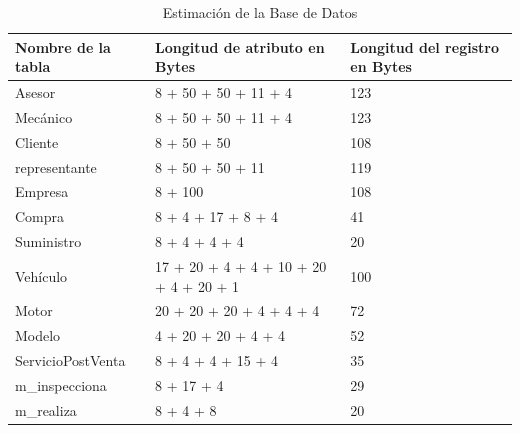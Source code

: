 \documentclass[12pt]{article}
\begin{document}
\begin{table}[h]
    \centering
    \begin{tabular}{|l|p{4cm}|p{4cm}|}
    \hline
    \textbf{Nombre de la tabla} & \textbf{Longitud de atributo en Bytes} & \textbf{Longitud del registro en Bytes} \\ \hline
    Asesor                      & 8 + 50 + 50 + 11 + 4                  & 123                                    \\ \hline
    Mecánico                    & 8 + 50 + 50 + 11 + 4                  & 123                                    \\ \hline
    Cliente                     & 8 + 50 + 50                           & 108                                    \\ \hline
    representante                   & 8 + 50 + 50 + 11                      & 119                                    \\ \hline
    Empresa                     & 8 + 100                               & 108                                    \\ \hline
    Compra                      & 8 + 4 + 17 + 8 + 4                    & 41                                     \\ \hline
    Suministro                  & 8 + 4 + 4 + 4                         & 20                                     \\ \hline
    Vehículo                    & 17 + 20 + 4 + 4 + 10 + 20 + 4 + 20 + 1 & 100                                    \\ \hline
    Motor                       & 20 + 20 + 20 + 4 + 4 + 4              & 72                                     \\ \hline
    Modelo                      & 4 + 20 + 20 + 4 + 4                   & 52                                     \\ \hline
    ServicioPostVenta           & 8 + 4 + 4 + 15 + 4                    & 35                                     \\ \hline
    m\_inspecciona              & 8 + 17 + 4                            & 29                                     \\ \hline
    m\_realiza                  & 8 + 4 + 8                             & 20                                     \\ \hline
    \end{tabular}
    \caption{Estimación de la Base de Datos}
\end{table}
\end{document}
